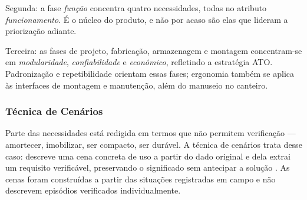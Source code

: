 Segunda: a fase \textit{função} concentra quatro necessidades, todas no atributo \textit{funcionamento}. É o núcleo do produto, e não por acaso são elas que lideram a priorização adiante.

Terceira: as fases de projeto, fabricação, armazenagem e montagem concentram-se em \textit{modularidade}, \textit{confiabilidade} e \textit{econômico}, refletindo a estratégia ATO. Padronização e repetibilidade orientam essas fases; ergonomia também se aplica às interfaces de montagem e manutenção, além do manuseio no canteiro.

\subsubsection{Técnica de Cenários}

Parte das necessidades está redigida em termos que não permitem verificação --- amortecer, imobilizar, ser compacto, ser durável. A técnica de cenários trata desse caso: descreve uma cena concreta de uso a partir do dado original e dela extrai um requisito verificável, preservando o significado sem antecipar a solução \citep{back2008}. As cenas foram construídas a partir das situações registradas em campo e não descrevem episódios verificados individualmente.


